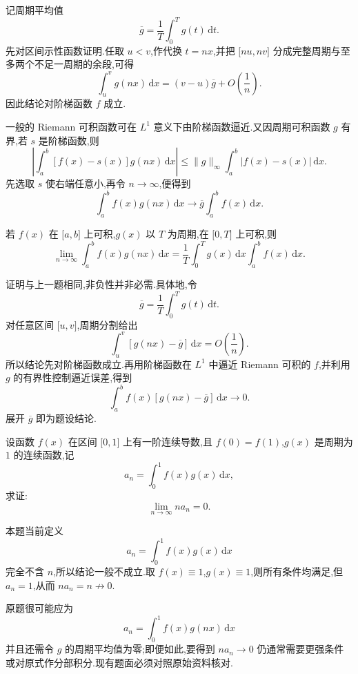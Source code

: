 \begin{solution}
    记周期平均值
    \[
        \overline g=\dfrac{1}{T}\int_0^Tg(t)\,\mathrm{d}t.
    \]
    先对区间示性函数证明.任取 $u<v$,作代换 $t=nx$,并把 $\lbrack nu,nv\rbrack$ 分成完整周期与至多两个不足一周期的余段,可得
    \[
        \displaystyle\int_u^v g(nx)\,\mathrm{d}x
        =(v-u)\overline g+O\left(\dfrac{1}{n}\right).
    \]
    因此结论对阶梯函数 $f$ 成立.

    一般的 Riemann 可积函数可在 $L^1$ 意义下由阶梯函数逼近.又因周期可积函数 $g$ 有界,若 $s$ 是阶梯函数,则
    \[
        \left|\int_a^b[f(x)-s(x)]g(nx)\,\mathrm{d}x\right|
        \leq\|g\|_\infty\int_a^b|f(x)-s(x)|\,\mathrm{d}x.
    \]
    先选取 $s$ 使右端任意小,再令 $n\to\infty$,便得到
    \[
        \displaystyle\int_a^b f(x)g(nx)\,\mathrm{d}x
        \longrightarrow\overline g\int_a^bf(x)\,\mathrm{d}x.
    \]
\end{solution}

\begin{example}
    若 $f(x)$ 在 $\lbrack a,b\rbrack$ 上可积,$g(x)$ 以 $T$ 为周期,在 $\lbrack 0,T\rbrack$ 上可积,则
    \[
        \displaystyle\lim\limits_{n\to\infty}\int_a^b f(x)g(nx)\,\mathrm{d}x
        =\dfrac{1}{T}\int_0^Tg(x)\,\mathrm{d}x\int_a^b f(x)\,\mathrm{d}x.
    \]
\end{example}
\exampleblank

\begin{solution}
    证明与上一题相同,非负性并非必需.具体地,令
    \[
        \overline g=\dfrac{1}{T}\int_0^Tg(t)\,\mathrm{d}t.
    \]
    对任意区间 $\lbrack u,v\rbrack$,周期分割给出
    \[
        \displaystyle\int_u^v[g(nx)-\overline g]\,\mathrm{d}x
        =O\left(\dfrac{1}{n}\right).
    \]
    所以结论先对阶梯函数成立.再用阶梯函数在 $L^1$ 中逼近 Riemann 可积的 $f$,并利用 $g$ 的有界性控制逼近误差,得到
    \[
        \displaystyle\int_a^b f(x)[g(nx)-\overline g]\,\mathrm{d}x\longrightarrow0.
    \]
    展开 $\overline g$ 即为题设结论.
\end{solution}

\begin{example}
    设函数 $f(x)$ 在区间 $\lbrack 0,1\rbrack$ 上有一阶连续导数,且 $f(0)=f(1)$,$g(x)$ 是周期为 $1$ 的连续函数,记
    \[
        a_n=\int_0^1 f(x)g(x)\,\mathrm{d}x,
    \]
    求证:
    \[
        \displaystyle\lim\limits_{n\to\infty}na_n=0.
    \]
\end{example}
\exampleblank

\begin{solution}
    本题当前定义
    \[
        a_n=\int_0^1f(x)g(x)\,\mathrm{d}x
    \]
    完全不含 $n$,所以结论一般不成立.取 $f(x)\equiv1$,$g(x)\equiv1$,则所有条件均满足,但 $a_n=1$,从而 $na_n=n\not\to0$.

    原题很可能应为
    \[
        a_n=\int_0^1f(x)g(nx)\,\mathrm{d}x
    \]
    并且还需令 $g$ 的周期平均值为零;即便如此,要得到 $na_n\to0$ 仍通常需要更强条件或对原式作分部积分.现有题面必须对照原始资料核对.
\end{solution}

